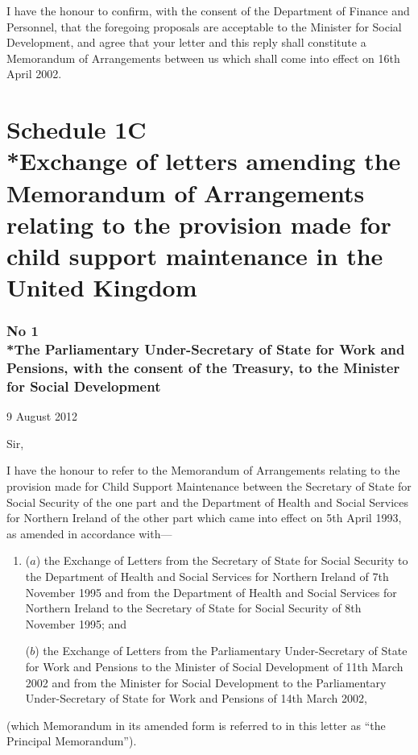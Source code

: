 \documentclass[12pt,a4paper]{article}
\begin{document}
I have the honour to confirm, with the consent of the Department of Finance and Personnel, that the foregoing proposals are acceptable to the Minister for Social Development, and agree that your letter and this reply shall constitute a Memorandum of Arrangements between us which shall come into effect on 16th April 2002.

\part[Schedule 1C --- Exchange of letters amending the Memorandum of Arrangements relating to the provision made for child support maintenance in the United Kingdom]{Schedule 1C\\*Exchange of letters amending the Memorandum of Arrangements relating to the provision made for child support maintenance in the United Kingdom}

\renewcommand\parthead{--- Schedule 1C}

\section*{No 1\\*The Parliamentary Under-Secretary of State for Work and Pensions, with the consent of the Treasury, to the Minister for Social Development}

9 August 2012

Sir,

I have the honour to refer to the Memorandum of Arrangements relating to the 
provision made for Child Support Maintenance between the Secretary of State for
Social Security of the one part and the Department of Health and Social Services for
Northern Ireland of the other part which came into effect on 5th April 1993, as
amended in accordance with---
\begin{enumerate}\item[]
($a$) the Exchange of Letters from the Secretary of State for Social Security to the Department of Health and Social Services for Northern Ireland of 7th November 1995 and from the Department of Health and Social Services for Northern Ireland to the Secretary of State for Social Security of 8th November 1995; and

($b$) the Exchange of Letters from the Parliamentary Under-Secretary of State for Work and Pensions to the Minister of Social Development of 11th March 2002 and from the Minister for Social Development to the Parliamentary Under-Secretary of State for Work and Pensions of 14th March 2002,
\end{enumerate}
(which Memorandum in its amended form is referred to in this letter as ``the Principal Memorandum'').
\end{document}
